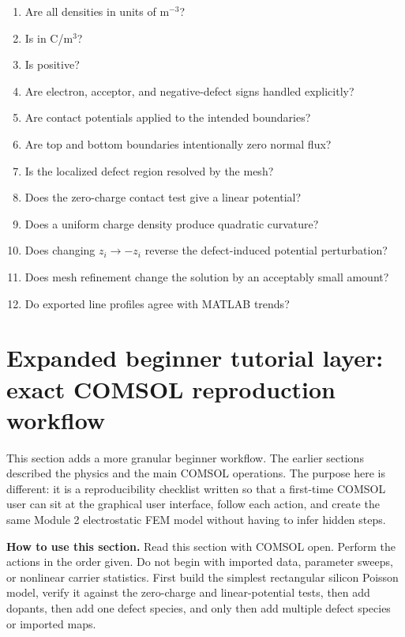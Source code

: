 \documentclass[11pt]{article}
\newcommand{\code}[1]{\texttt{\detokenize{#1}}}
\begin{document}
\begin{enumerate}[leftmargin=2em]
\item Are all densities in units of m$^{-3}$?
\item Is \code{rho\_tot} in C/m$^3$?
\item Is \code{q0} positive?
\item Are electron, acceptor, and negative-defect signs handled explicitly?
\item Are contact potentials applied to the intended boundaries?
\item Are top and bottom boundaries intentionally zero normal flux?
\item Is the localized defect region resolved by the mesh?
\item Does the zero-charge contact test give a linear potential?
\item Does a uniform charge density produce quadratic curvature?
\item Does changing $z_i\rightarrow -z_i$ reverse the defect-induced potential perturbation?
\item Does mesh refinement change the solution by an acceptably small amount?
\item Do exported line profiles agree with MATLAB trends?
\end{enumerate}


\section{Expanded beginner tutorial layer: exact COMSOL reproduction workflow}

This section adds a more granular beginner workflow. The earlier sections described the physics and the main COMSOL operations. The purpose here is different: it is a reproducibility checklist written so that a first-time COMSOL user can sit at the graphical user interface, follow each action, and create the same Module 2 electrostatic FEM model without having to infer hidden steps.

\begin{overviewbox}
\textbf{How to use this section.} Read this section with COMSOL open. Perform the actions in the order given. Do not begin with imported data, parameter sweeps, or nonlinear carrier statistics. First build the simplest rectangular silicon Poisson model, verify it against the zero-charge and linear-potential tests, then add dopants, then add one defect species, and only then add multiple defect species or imported maps.
\end{overviewbox}
\end{document}
